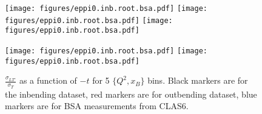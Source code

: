 \begin{figure}[hbt]
	\centering
	\texttt{[image: figures/eppi0.inb.root.bsa.pdf]}
	\texttt{[image: figures/eppi0.inb.root.bsa.pdf]}
	\texttt{[image: figures/eppi0.inb.root.bsa.pdf]}
	
	\texttt{[image: figures/eppi0.inb.root.bsa.pdf]}
	\texttt{[image: figures/eppi0.inb.root.bsa.pdf]}
	
	
	\caption{$\frac{\sigma_{LT'}}{\sigma_T}$ as a function of $-t$ for 5 $\{Q^2,x_B\}$ bins. Black markers are for the inbending dataset, red markers are for outbending dataset, blue markers are for BSA measurements from CLAS6.}
	\label{fig:slts0inq2xb}
\end{figure}